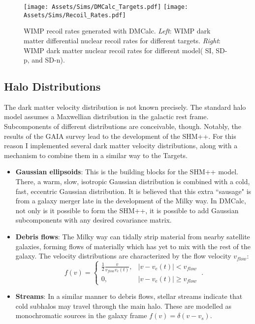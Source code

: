 \begin{figure}
    \centering
    \texttt{[image: Assets/Sims/DMCalc\_Targets.pdf]}
    \texttt{[image: Assets/Sims/Recoil\_Rates.pdf]}
    \caption[WIMP recoil rates generated with DMCalc]%
    {WIMP recoil rates generated with DMCalc.
    \textit{Left}: WIMP dark matter differential nuclear recoil rates for different targets.
    \textit{Right}: WIMP dark matter nuclear recoil rates for different model( SI, SD-p, and SD-n).}
    \label{fig:recoil_rates_dmc}
\end{figure}
\subsection{Halo Distributions}

The dark matter velocity distribution is not known precisely. 
The standard halo model assumes a Maxwellian distribution in the galactic rest frame.
Subcomponents of different distributions are conceivable, though. 
Notably, the results of the GAIA survey lead to the development of the SHM++\cite{evans_refinement_2019}. 
For this reason I implemented several dark matter velocity distributions, along with a mechanism to combine them in a similar way to the Targets.

\begin{itemize}
    \item \textbf{Gaussian ellipsoids}: This is the building blocks for the SHM++ model.
    There, a warm, slow, isotropic Gaussian distribution is combined with a cold, fast, eccentric Gaussian distribution. 
    It is believed that this extra ``sausage" is from a galaxy merger late in the development of the Milky way.
    In DMCalc, not only is it possible to form the SHM++, it is possible to add Gaussian subcomponents with any desired covariance matrix.
    \item \textbf{Debris flows}: The Milky way can tidally strip material from nearby satellite galaxies, forming flows of materially which has yet to mix with the rest of the galaxy\cite{kuhlen_direct_2012}. 
    The velocity distributions are characterized by the flow velocity $v_{flow}$:
    \begin{equation}
        f(v) = \begin{cases}
        \frac{1}{2} \frac{v}{v_{flow} v_e(t)}, & |v-v_e(t)| < v_{flow}\\
        0,& |v-v_e(t)| \geq v_{flow}
        \end{cases}\;.
    \end{equation}
    \item \textbf{Streams}: In a similar manner to debris flows, stellar streams \cite{banik_probing_2018} indicate that cold subhalos may travel through the main halo.
    These are modelled as monochromatic sources in the galaxy frame $f(v) = \delta(v - v_s)$.
\end{itemize}

